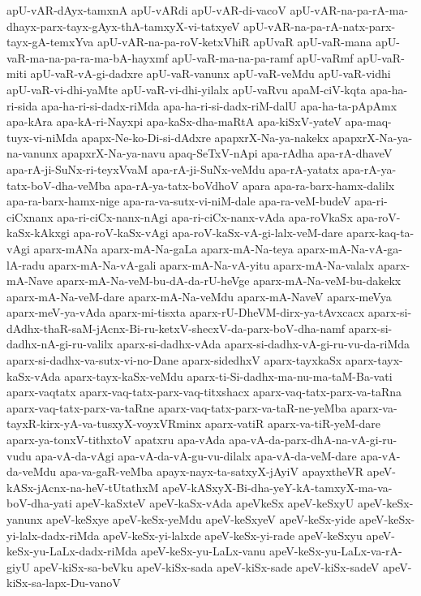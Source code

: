 {apU-vAR-dAyx-tamxnA
apU-vARdi
apU-vAR-di-vacoV
apU-vAR-na-pa-rA-ma-dhayx-parx-tayx-gAyx-thA-tamxyX-vi-tatxyeV
apU-vAR-na-pa-rA-natx-parx-tayx-gA-temxYva
apU-vAR-na-pa-roV-ketxVhiR
apUvaR
apU-vaR-mana
apU-vaR-ma-na-pa-ra-ma-bA-hayxmf
apU-vaR-ma-na-pa-ramf
apU-vaRmf
apU-vaR-miti
apU-vaR-vA-gi-dadxre
apU-vaR-vanunx
apU-vaR-veMdu
apU-vaR-vidhi
apU-vaR-vi-dhi-yaMte
apU-vaR-vi-dhi-yilalx
apU-vaRvu
apaM-ciV-kqta
apa-ha-ri-sida
apa-ha-ri-si-dadx-riMda
apa-ha-ri-si-dadx-riM-dalU
apa-ha-ta-pApAmx
apa-kAra
apa-kA-ri-Nayxpi
apa-kaSx-dha-maRtA
apa-kiSxV-yateV
apa-maq-tuyx-vi-niMda
apapx-Ne-ko-Di-si-dAdxre
apapxrX-Na-ya-nakekx
apapxrX-Na-ya-na-vanunx
apapxrX-Na-ya-navu
apaq-SeTxV-nApi
apa-rAdha
apa-rA-dhaveV
apa-rA-ji-SuNx-ri-teyxVvaM
apa-rA-ji-SuNx-veMdu
apa-rA-yatatx
apa-rA-ya-tatx-boV-dha-veMba
apa-rA-ya-tatx-boVdhoV
apara
apa-ra-barx-hamx-dalilx
apa-ra-barx-hamx-nige
apa-ra-va-sutx-vi-niM-dale
apa-ra-veM-budeV
apa-ri-ciCxnanx
apa-ri-ciCx-nanx-nAgi
apa-ri-ciCx-nanx-vAda
apa-roVkaSx
apa-roV-kaSx-kAkxgi
apa-roV-kaSx-vAgi
apa-roV-kaSx-vA-gi-lalx-veM-dare
aparx-kaq-ta-vAgi
aparx-mANa
aparx-mA-Na-gaLa
aparx-mA-Na-teya
aparx-mA-Na-vA-ga-lA-radu
aparx-mA-Na-vA-gali
aparx-mA-Na-vA-yitu
aparx-mA-Na-valalx
aparx-mA-Nave
aparx-mA-Na-veM-bu-dA-da-rU-heVge
aparx-mA-Na-veM-bu-dakekx
aparx-mA-Na-veM-dare
aparx-mA-Na-veMdu
aparx-mA-NaveV
aparx-meVya
aparx-meV-ya-vAda
aparx-mi-tisxta
aparx-rU-DheVM-dirx-ya-tAvxcacx
aparx-si-dAdhx-thaR-saM-jAcnx-Bi-ru-ketxV-shecxV-da-parx-boV-dha-namf
aparx-si-dadhx-nA-gi-ru-valilx
aparx-si-dadhx-vAda
aparx-si-dadhx-vA-gi-ru-vu-da-riMda
aparx-si-dadhx-va-sutx-vi-no-Dane
aparx-sidedhxV
aparx-tayxkaSx
aparx-tayx-kaSx-vAda
aparx-tayx-kaSx-veMdu
aparx-ti-Si-dadhx-ma-nu-ma-taM-Ba-vati
aparx-vaqtatx
aparx-vaq-tatx-parx-vaq-titxshacx
aparx-vaq-tatx-parx-va-taRna
aparx-vaq-tatx-parx-va-taRne
aparx-vaq-tatx-parx-va-taR-ne-yeMba
aparx-va-tayxR-kirx-yA-va-tusxyX-voyxVRminx
aparx-vatiR
aparx-va-tiR-yeM-dare
aparx-ya-tonxV-tithxtoV
apatxru
apa-vAda
apa-vA-da-parx-dhA-na-vA-gi-ru-vudu
apa-vA-da-vAgi
apa-vA-da-vA-gu-vu-dilalx
apa-vA-da-veM-dare
apa-vA-da-veMdu
apa-va-gaR-veMba
apayx-nayx-ta-satxyX-jAyiV
apayxtheVR
apeV-kASx-jAcnx-na-heV-tUtathxM
apeV-kASxyX-Bi-dha-yeY-kA-tamxyX-ma-va-boV-dha-yati
apeV-kaSxteV
apeV-kaSx-vAda
apeVkeSx
apeV-keSxyU
apeV-keSx-yanunx
apeV-keSxye
apeV-keSx-yeMdu
apeV-keSxyeV
apeV-keSx-yide
apeV-keSx-yi-lalx-dadx-riMda
apeV-keSx-yi-lalxde
apeV-keSx-yi-rade
apeV-keSxyu
apeV-keSx-yu-LaLx-dadx-riMda
apeV-keSx-yu-LaLx-vanu
apeV-keSx-yu-LaLx-va-rA-giyU
apeV-kiSx-sa-beVku
apeV-kiSx-sada
apeV-kiSx-sade
apeV-kiSx-sadeV
apeV-kiSx-sa-lapx-Du-vanoV
}
